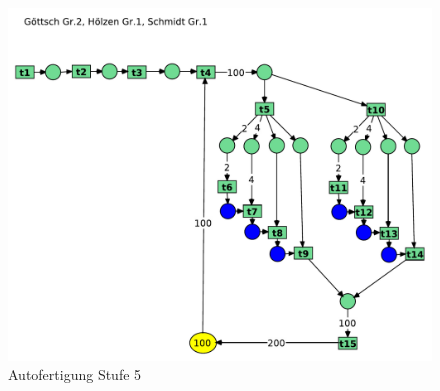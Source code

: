 \documentclass[12pt, paper=a4]{article}
\begin{document}
\begin{figure}[h!]
\centering
\includegraphics[scale=0.7]{7-5-5.pdf}
\caption{Autofertigung Stufe 5}
\end{figure}
\end{document}
